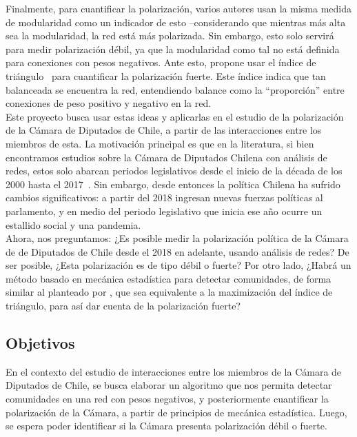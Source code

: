 \documentclass{proyectotesis}
\begin{document}
Finalmente, para cuantificar la polarización, varios autores usan la misma medida de modularidad como un indicador de esto --considerando que mientras más alta sea la modularidad, la red está más polarizada. Sin embargo, esto solo servirá para medir polarización débil, ya que la modularidad como tal no está definida para conexiones con pesos negativos. Ante esto, \citet{neal_sign_2020} propone usar el índice de triángulo~\cite{aref_measuring_2018} para cuantificar la polarización fuerte. Este índice indica que tan balanceada se encuentra la red, entendiendo balance como la ``proporción'' entre conexiones de peso positivo y negativo en la red.\\

Este proyecto busca usar estas ideas y aplicarlas en el estudio de la polarización de la Cámara de Diputados de Chile, a partir de las interacciones entre los miembros de esta. La motivación principal es que en la literatura, si bien encontramos estudios sobre la Cámara de Diputados Chilena con análisis de redes, estos solo abarcan periodos legislativos desde el inicio de la década de los 2000 hasta el 2017~\cite{aleman_explaining_2013, le_foulon_moran_cooperation_2020}. Sin embargo, desde entonces la política Chilena ha sufrido cambios significativos: a partir del 2018 ingresan nuevas fuerzas políticas al parlamento, y en medio del periodo legislativo que inicia ese año ocurre un estallido social y una pandemia.\\

Ahora, nos preguntamos: ¿Es posible medir la polarización política de la Cámara de de Diputados de Chile desde el 2018 en adelante, usando análisis de redes? De ser posible, ¿Esta polarización es de tipo débil o fuerte? Por otro lado, ¿Habrá un método basado en mecánica estadística para detectar comunidades, de forma similar al planteado por \citet{reichardt_statistical_2006},  que sea equivalente a la maximización del índice de triángulo, para así dar cuenta de la polarización fuerte? %

\subsection{Objetivos}

En el contexto del estudio de interacciones entre los miembros de la Cámara de Diputados de Chile, se busca elaborar un algoritmo que nos permita detectar comunidades en una red con pesos negativos, y posteriormente cuantificar la polarización de la Cámara, a partir de principios de mecánica estadística. Luego, se espera poder identificar si la Cámara presenta polarización débil o fuerte.
\end{document}
